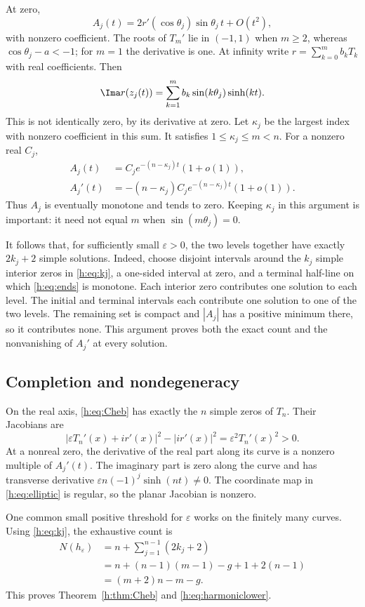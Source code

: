 \documentclass[UTF8,11pt]{ctexart}
\theoremstyle{definition}
\numberwithin{equation}{section}
\newcommand{\eps}{\varepsilon}\newcommand{\ep}{\varepsilon}
\begin{document}
At zero,
\[
 A_j(t)=2r'(\cos\theta_j)\sin\theta_j\,t+O(t^2),
\]
with nonzero coefficient. The roots of $T_m'$ lie in $(-1,1)$ when
$m\ge2$, whereas $\cos\theta_j-a<-1$; for $m=1$ the derivative is one.
At infinity write $r=\sum_{k=0}^m b_kT_k$ with real coefficients.
Then
\[
 \Ima r(z_j(t))=\sum_{k=1}^m b_k\sin(k\theta_j)\sinh(kt).
\]
This is not identically zero, by its derivative at zero. Let
$\kappa_j$ be the largest index with nonzero coefficient in this sum.
It satisfies $1\le\kappa_j\le m<n$. For a nonzero real $C_j$,
\begin{equation}\label{h:eq:ends}
 \begin{split}
 A_j(t)&=C_j e^{-(n-\kappa_j)t}(1+o(1)),\\
 A_j'(t)&=-(n-\kappa_j)C_j e^{-(n-\kappa_j)t}(1+o(1)).
 \end{split}
\end{equation}
Thus $A_j$ is eventually monotone and tends to zero. Keeping
$\kappa_j$ in this argument is important: it need not equal $m$ when
$\sin(m\theta_j)=0$.

It follows that, for sufficiently small $\eps>0$, the two levels together
have exactly $2k_j+2$ simple solutions. Indeed, choose disjoint intervals
around the $k_j$ simple interior zeros in \eqref{h:eq:kj}, a one-sided
interval at zero, and a terminal half-line on which \eqref{h:eq:ends} is
monotone. Each interior zero contributes one solution to each level.
The initial and terminal intervals each contribute one solution to one
of the two levels. The remaining set is compact and $|A_j|$ has a
positive minimum there, so it contributes none. This argument proves
both the exact count and the nonvanishing of $A_j'$ at every solution.

\subsection{Completion and nondegeneracy}
On the real axis, \eqref{h:eq:Cheb} has exactly the $n$ simple zeros of $T_n$.
Their Jacobians are
\[
 |\eps T_n'(x)+ir'(x)|^2-|ir'(x)|^2=\eps^2T_n'(x)^2>0.
\]
At a nonreal zero, the derivative of the real part along its curve is
a nonzero multiple of $A_j'(t)$. The imaginary part is zero along the
curve and has transverse derivative
$\eps n(-1)^j\sinh(nt)\ne0$. The coordinate map in \eqref{h:eq:elliptic}
is regular, so the planar Jacobian is nonzero.

One common small positive threshold for $\eps$ works on the finitely
many curves. Using \eqref{h:eq:kj}, the exhaustive count is
\[
 \begin{split}
 N(h_\eps)
 &=n+\sum_{j=1}^{n-1}(2k_j+2)\\
 &=n+(n-1)(m-1)-g+1+2(n-1)\\
 &=(m+2)n-m-g.
 \end{split}
\]
This proves Theorem~\ref{h:thm:Cheb} and \eqref{h:eq:harmoniclower}.
\end{document}

